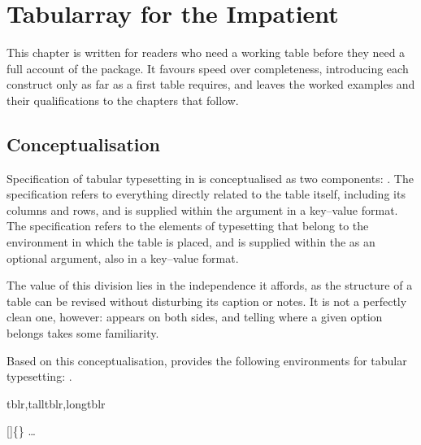 \chapter{Tabularray for the Impatient}
This chapter is written for readers who need a working table before they need a full account of the package. It favours speed over completeness, introducing each construct only as far as a first table requires, and leaves the worked examples and their qualifications to the chapters that follow.

\section{Conceptualisation}\label{impatient:concept}
Specification of tabular typesetting in  is conceptualised as two components: . The  specification refers to everything directly related to the table itself, including its columns and rows, and is supplied within the  argument in a key--value format. The  specification refers to the elements of typesetting that belong to the environment in which the table is placed, and is supplied within the  as an optional argument, also in a key--value format.

The value of this division lies in the independence it affords, as the structure of a table can be revised without disturbing its caption or notes. It is not a perfectly clean one, however:  appears on both sides, and telling where a given option belongs takes some familiarity.

Based on this conceptualisation,  provides the following environments for tabular typesetting: .

\begin{codedescribe}[env]{tblr,talltblr,longtblr}
  \begin{codesyntax}
    []\{\}
        \quad\ldots
        \tsmacro{\end{tblr}}{}
  \end{codesyntax}
\end{codedescribe}

